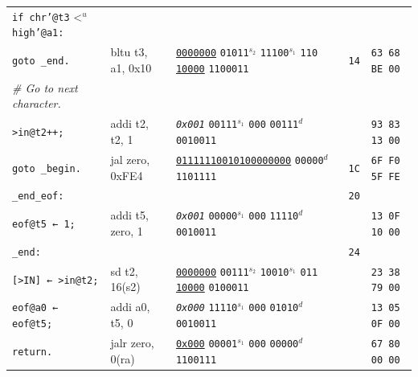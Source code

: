 \documentclass[a4paper,12pt,final]{article}
\begin{document}
\begin{table}[!htbp]
\begin{adjustwidth}{-1cm}{-1cm}
\begin{center}
\begin{tabular}{l|ll|l|l}
\hspace{1.053000em} \texttt{if chr'@t3} \textless{}\(^{u}\) \texttt{high'@a1:} &  &  &  & \\[0pt]
\hspace{2.106000em}   \texttt{goto \_end.} & bltu t3, a1, 0x10 & \uline{\texttt{0000000}} \texttt{01011}​\(^{s_{2}}\) \texttt{11100}​\(^{s_{1}}\) \texttt{110} \uline{\texttt{10000}} \texttt{1100011} & \texttt{14} & \texttt{63 68 BE 00}\\[0pt]
\hspace{1.053000em} \emph{\# Go to next character.} &  &  &  & \\[0pt]
\hspace{1.053000em} \texttt{>in@t2++;} & addi t2, t2, 1 & \emph{\texttt{0x001}}                    \texttt{00111}​\(^{s_{1}}\) \texttt{000} \texttt{00111}​\(^{d}\)  \texttt{0010011} &  & \texttt{93 83 13 00}\\[0pt]
\hspace{1.053000em} \texttt{goto \_begin.} & jal zero, 0xFE4 & \uline{\texttt{01111110010100000000}}                                     \texttt{00000}​\(^{d}\)  \texttt{1101111} & \texttt{1C} & \texttt{6F F0 5F FE}\\[0pt]
\texttt{\_end\_eof:} &  &  & \texttt{20} & \\[0pt]
\hspace{1.053000em} \texttt{eof@t5 ← 1;} & addi t5, zero, 1 & \emph{\texttt{0x001}}                    \texttt{00000}​\(^{s_{1}}\) \texttt{000} \texttt{11110}​\(^{d}\)  \texttt{0010011} &  & \texttt{13 0F 10 00}\\[0pt]
\texttt{\_end:} &  &  & \texttt{24} & \\[0pt]
\hspace{1.053000em} \texttt{[>IN] ← >in@t2;} & sd t2, 16(s2) & \uline{\texttt{0000000}} \texttt{00111}​\(^{s_{2}}\) \texttt{10010}​\(^{s_{1}}\) \texttt{011} \uline{\texttt{10000}} \texttt{0100011} &  & \texttt{23 38 79 00}\\[0pt]
\hspace{1.053000em} \texttt{eof@a0 ← eof@t5;} & addi a0, t5, 0 & \emph{\texttt{0x000}}                    \texttt{11110}​\(^{s_{1}}\) \texttt{000} \texttt{01010}​\(^{d}\)  \texttt{0010011} &  & \texttt{13 05 0F 00}\\[0pt]
\hspace{1.053000em} \texttt{return.} & jalr zero, 0(ra) & \uline{\texttt{0x000}}                    \texttt{00001}​\(^{s_{1}}\) \texttt{000} \texttt{00000}​\(^{d}\)  \texttt{1100111} &  & \texttt{67 80 00 00}\\[0pt]
\end{tabular}

\end{center}
\normalsize \end{adjustwidth} \end{table} \vspace{0}
\end{document}
